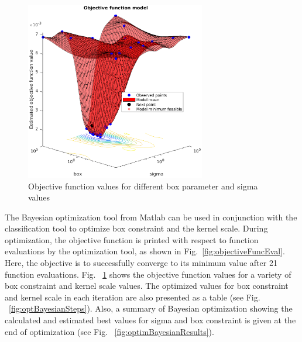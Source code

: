 \begin{figure}
\begin{center}
\includegraphics[width=0.7\textwidth]{figures/objFuncModel}    %
\caption{Objective function values for different box parameter and sigma values} 
\label{fig:objFuncModel}
\end{center}
\end{figure}


The Bayesian optimization tool from Matlab can be used in conjunction with the classification tool to optimize box constraint and the kernel scale. 
During optimization, the objective function is printed with respect to function evaluations by the optimization tool, as shown in Fig.~\ref{fig:objectiveFuncEval}. Here, the objective is to successfully converge to its minimum value after 21 function evaluations.
Fig. ~\ref{fig:objFuncModel} shows the objective function values for a variety of box constraint and kernel scale values. 
The optimized values for box constraint and kernel scale in each iteration are also presented as a table (see Fig. ~\ref{fig:optBayesianSteps}). 
Also, a summary of Bayesian optimization showing the calculated and estimated best values for sigma and box constraint is given at the end of optimization (see Fig. ~\ref{fig:optimBayesianResults}).

